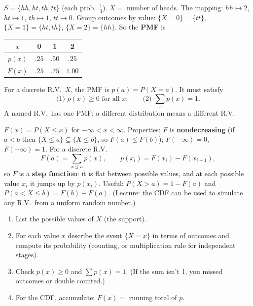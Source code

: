 \documentclass[11pt]{article}
\begin{document}
\begin{exbox}
$S=\{hh,ht,th,tt\}$ (each prob.\ $\tfrac14$). $X=$ number of heads. The mapping: $hh\mapsto2$, $ht\mapsto1$, $th\mapsto1$, $tt\mapsto0$. Group outcomes by value: $\{X=0\}=\{tt\}$, $\{X=1\}=\{ht,th\}$, $\{X=2\}=\{hh\}$. So the \textbf{PMF} is
\begin{center}
\begin{tabular}{c|ccc}
$x$ & 0 & 1 & 2\\\hline
$p(x)$ & $.25$ & $.50$ & $.25$\\
$F(x)$ & $.25$ & $.75$ & $1.00$
\end{tabular}
\end{center}
\end{exbox}

\begin{defbox}
For a discrete R.V.\ $X$, the PMF is $p(a)=P(X=a)$. It must satisfy
\[ \text{(1) } p(x)\ge0\text{ for all }x,\qquad\text{(2) }\sum_xp(x)=1. \]
A named R.V.\ has one PMF; a different distribution means a different R.V.
\end{defbox}

\begin{defbox}
$F(x)=P(X\le x)$ for $-\infty<x<\infty$. Properties: $F$ is \textbf{nondecreasing} (if $a<b$ then $\{X\le a\}\subseteq\{X\le b\}$, so $F(a)\le F(b)$); $F(-\infty)=0$, $F(+\infty)=1$. For a discrete R.V.
\[ F(a)=\sum_{x\le a}p(x),\qquad p(x_i)=F(x_i)-F(x_{i-1}), \]
so $F$ is a \textbf{step function}: it is flat between possible values, and at each possible value $x_i$ it jumps up by $p(x_i)$. Useful: $P(X>a)=1-F(a)$ and $P(a<X\le b)=F(b)-F(a)$. (Lecture: the CDF can be used to simulate any R.V.\ from a uniform random number.)
\end{defbox}

\begin{methodbox}
\begin{enumerate}
\item List the possible values of $X$ (the support).
\item For each value $x$ describe the event $\{X=x\}$ in terms of outcomes and compute its probability (counting, or multiplication rule for independent stages).
\item Check $p(x)\ge0$ and $\sum p(x)=1$. (If the sum isn't 1, you missed outcomes or double counted.)
\item For the CDF, accumulate: $F(x)=$ running total of $p$.
\end{enumerate}
\end{methodbox}
\end{document}
